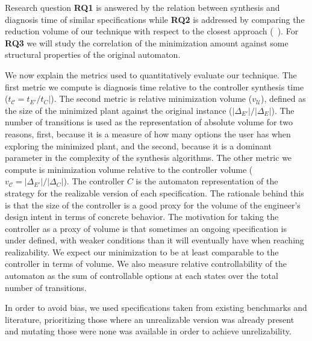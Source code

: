Research question \textbf{RQ1} is answered by the relation between synthesis and diagnosis time of similar specifications while \textbf{RQ2} is addressed by comparing the reduction volume of our technique with respect to the closest approach (~\cite{DBLP:conf/hvc/KonighoferHB10}). For \textbf{RQ3} we will study the correlation of the minimization amount against some structural properties of the original automaton.

We now explain the metrics used to quantitatively evaluate our technique. 
The first metric we compute is diagnosis time relative to the controller synthesis time ($t_{\mathcal{C}}=t_{E'}/t_{C}|$). The second metric is relative minimization volume ($v_{\mathcal{U}}$), defined as the size of the minimized plant against the original instance ($|\Delta_{E'}|/|\Delta_{E}|$). 
The number of transitions is used as the representation of absolute volume for two reasons, first, because it is a measure of how many options the user has when exploring the minimized plant, and the  second, because it is a dominant parameter in the complexity of the synthesis algorithms. 
The other metric we compute is minimization volume relative to the controller volume ($v_{\mathcal{C}}=|\Delta_{E'}|/|\Delta_{C}|$). The controller $C$ is the automaton representation of the strategy for the realizable version of each specification. The rationale behind this is that the size of the controller is a good proxy for the volume of the engineer's design intent in terms of concrete behavior. The motivation for taking the controller as a proxy of volume is that sometimes an ongoing specification is under defined, with weaker conditions than it will eventually have when reaching realizability. We expect our minimization to be at least comparable to the controller in terms of volume. We also measure relative controllability of the automaton as the sum of controllable options at each states over the total number of transitions.

In order to avoid bias, we used specifications taken from existing benchmarks and literature, prioritizing those where an unrealizable version was already present and mutating those were none was available in order to achieve unrelizability. 

